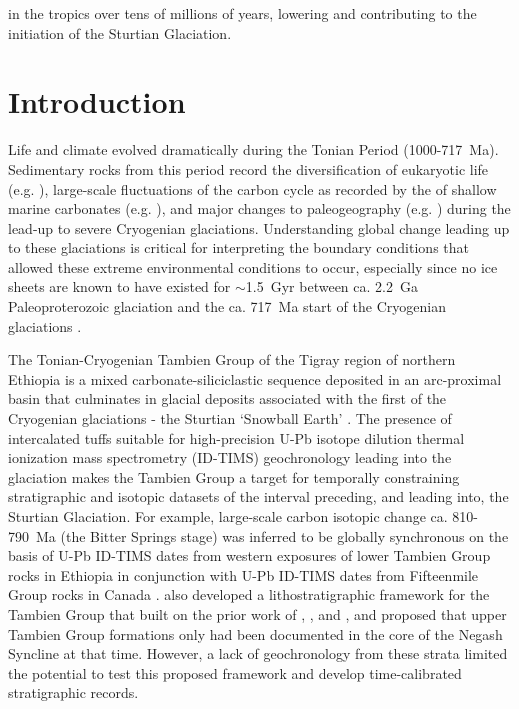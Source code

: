 in the tropics over tens of millions of years, lowering \pCOtwo and contributing to the initiation of the Sturtian Glaciation.

\section{Introduction}

Life and climate evolved dramatically during the Tonian Period (1000-717~Ma). Sedimentary rocks from this period record the diversification of eukaryotic life (e.g. \citealp{Knoll2006a, Butterfield2015a}), large-scale fluctuations of the carbon cycle as recorded by the \dC of shallow marine carbonates (e.g. \citealp{Halverson2005a}), and major changes to paleogeography (e.g. \citealp{Li2008a, Li2013a, Merdith2017a}) during the lead-up to severe Cryogenian glaciations. Understanding global change leading up to these glaciations is critical for interpreting the boundary conditions that allowed these extreme environmental conditions to occur, especially since no ice sheets are known to have existed for $\sim$1.5~Gyr between ca. 2.2~Ga Paleoproterozoic glaciation \citep{Evans1997a} and the ca. 717~Ma start of the Cryogenian glaciations \citep{Macdonald2010a, MacLennan2018a}.

The Tonian-Cryogenian Tambien Group of the Tigray region of northern Ethiopia is a mixed carbonate-siliciclastic sequence deposited in an arc-proximal basin that culminates in glacial deposits associated with the first of the Cryogenian glaciations - the Sturtian `Snowball Earth' \citep{Beyth2003a, Miller2003a, Swanson-Hysell2015a, MacLennan2018a}. The presence of intercalated tuffs suitable for high-precision U-Pb isotope dilution thermal ionization mass spectrometry (ID-TIMS) geochronology leading into the glaciation makes the Tambien Group a target for temporally constraining stratigraphic and isotopic datasets of the interval preceding, and leading into, the Sturtian Glaciation. For example, large-scale carbon isotopic change ca. 810-790~Ma (the Bitter Springs stage) was inferred to be globally synchronous on the basis of U-Pb ID-TIMS dates from western exposures of lower Tambien Group rocks in Ethiopia \citep{Swanson-Hysell2015a} in conjunction with U-Pb ID-TIMS dates from Fifteenmile Group rocks in Canada \citep{Macdonald2010a}. \citet{Swanson-Hysell2015a} also developed a lithostratigraphic framework for the Tambien Group that built on the prior work of \citet{Beyth1972a}, \citet{Hailu1975a}, and \citet{Garland1980a}, and proposed that upper Tambien Group formations only had been documented in the core of the Negash Syncline at that time. However, a lack of geochronology from these strata limited the potential to test this proposed framework and develop time-calibrated stratigraphic records.

